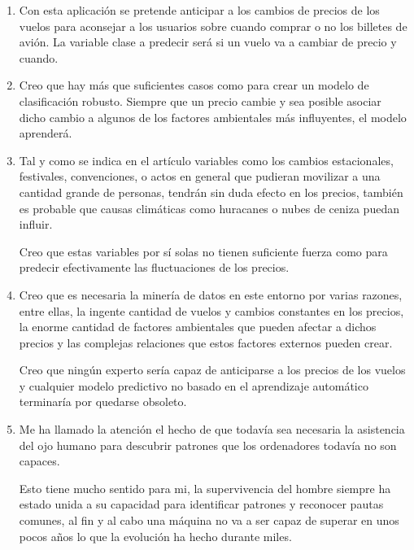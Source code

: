 \documentclass[es]{ifirak}
\begin{document}
\begin{enumerate}

\item  Con esta aplicación se pretende anticipar a los cambios de precios de los vuelos para aconsejar a los usuarios sobre cuando comprar o no los billetes de avión. La variable clase a predecir será si un vuelo va a cambiar de precio y cuando.

\item Creo que hay más que suficientes casos como para crear un modelo de clasificación robusto. Siempre que un precio cambie y sea posible asociar dicho cambio a algunos de los factores ambientales más influyentes, el modelo aprenderá.

\item Tal y como se indica en el artículo variables como los cambios estacionales, festivales, convenciones, o actos en general que pudieran movilizar a una cantidad grande de personas, tendrán sin duda efecto en los precios, también es probable que causas climáticas como huracanes o nubes de ceniza puedan influir. 

Creo que estas variables por sí solas no tienen suficiente fuerza como para predecir efectivamente las fluctuaciones de los precios.

\item Creo que es necesaria la minería de datos en este entorno por varias razones, entre ellas, la ingente cantidad de vuelos y cambios constantes en los precios, la enorme cantidad de factores ambientales que pueden afectar a dichos precios y las complejas relaciones que estos factores externos pueden crear. 

Creo que ningún experto sería capaz de anticiparse a los precios de los vuelos y 	cualquier modelo predictivo no basado en el aprendizaje automático terminaría por 	quedarse obsoleto.


\item Me ha llamado la atención el hecho de que todavía sea necesaria la asistencia del ojo humano para descubrir patrones que los ordenadores todavía no son capaces. 

Esto tiene mucho sentido para mi, la supervivencia del hombre siempre ha estado unida a su capacidad para identificar patrones y reconocer pautas comunes, al fin y al cabo una máquina no va a ser capaz de superar en unos pocos años lo que la evolución ha hecho durante miles.

\end{enumerate}
\end{document}
